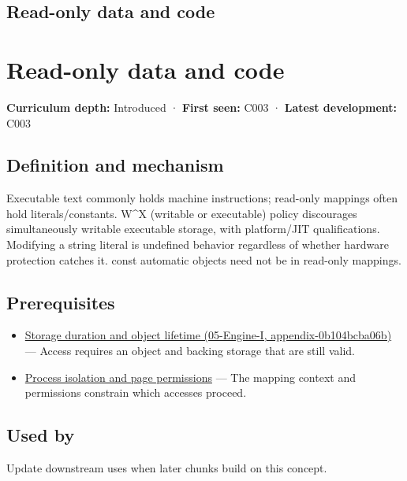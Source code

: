 \hypertarget{appendix-5f9e5e2f0a5e}{}
\section*{Read-only data and code}
\chapter{Read-only data and code}\label{appendix-5f9e5e2f0a5e-read-only-data-and-code}

\textbf{Curriculum depth:} Introduced · \textbf{First seen:} C003 · \textbf{Latest development:} C003

\section{Definition and mechanism}\label{appendix-5f9e5e2f0a5e-definition-and-mechanism}

Executable text commonly holds machine instructions; read-only mappings often hold literals/constants. W\^{}X (writable or executable) policy discourages simultaneously writable executable storage, with platform/JIT qualifications. Modifying a string literal is undefined behavior regardless of whether hardware protection catches it. const automatic objects need not be in read-only mappings.

\section{Prerequisites}\label{appendix-5f9e5e2f0a5e-prerequisites}

\begin{itemize}
\tightlist
\item
  \href{../05-Engine-I/main.pdf\#nameddest=appendix-0b104bcba06b}{Storage duration and object lifetime (05-Engine-I, appendix-0b104bcba06b)} --- Access requires an object and backing storage that are still valid.
\item
  \hyperref[appendix-c2a9ad1e2b49]{Process isolation and page permissions} --- The mapping context and permissions constrain which accesses proceed.
\end{itemize}

\section{Used by}\label{appendix-5f9e5e2f0a5e-used-by}

Update downstream uses when later chunks build on this concept.

